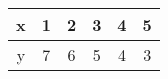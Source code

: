 \resizebox{\columnwidth}{!} {
	\begin{tabular}{|c|c|c|c|c|c|}
		\hline
		x &1 &2&3 & 4& 5 \\
		\hline
		y &7 & 6 & 5 &4 & 3\\
		\hline
	\end{tabular}
}